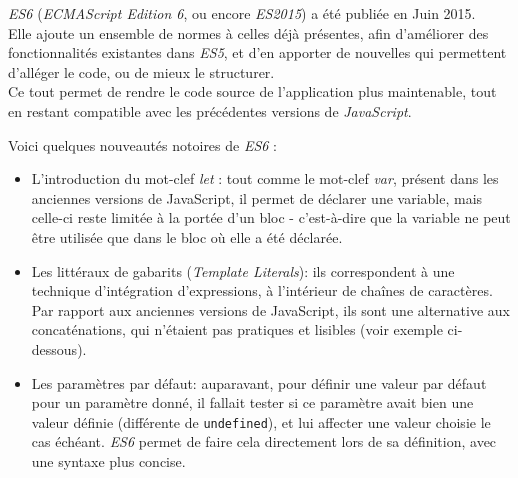 \documentclass[12pt,a4paper]{article}
\newenvironment{Shaded}{}{}
\newcommand{\KeywordTok}[1]{\textcolor[rgb]{0.00,0.44,0.13}{\textbf{{#1}}}}
\newcommand{\SpecialCharTok}[1]{\textcolor[rgb]{0.25,0.44,0.63}{{#1}}}
\newcommand{\StringTok}[1]{\textcolor[rgb]{0.25,0.44,0.63}{{#1}}}
\newcommand{\VerbatimStringTok}[1]{\textcolor[rgb]{0.25,0.44,0.63}{{#1}}}
\newcommand{\CommentTok}[1]{\textcolor[rgb]{0.38,0.63,0.69}{\textit{{#1}}}}
\newcommand{\OperatorTok}[1]{\textcolor[rgb]{0.40,0.40,0.40}{{#1}}}
\newcommand{\NormalTok}[1]{{#1}}
\begin{document}
  \bigskip

  \emph{ES6} (\emph{ECMAScript Edition 6}, ou encore \emph{ES2015}) a été
  publiée en Juin 2015.\\
  Elle ajoute un ensemble de normes à celles déjà présentes, afin
  d'améliorer des fonctionnalités existantes dans \emph{ES5}, et d'en
  apporter de nouvelles qui permettent d'alléger le code, ou de mieux le
  structurer.\\
  Ce tout permet de rendre le code source de l'application plus
  maintenable, tout en restant compatible avec les précédentes versions de
  \emph{JavaScript}.

  \bigskip

  Voici quelques nouveautés notoires de \emph{ES6} :

  \begin{itemize}
  \item
    L'introduction du mot-clef \emph{let} : tout comme le mot-clef
    \emph{var}, présent dans les anciennes versions de JavaScript, il
    permet de déclarer une variable, mais celle-ci reste limitée à la
    portée d'un bloc - c'est-à-dire que la variable ne peut être utilisée
    que dans le bloc où elle a été déclarée.
  \item
    Les littéraux de gabarits (\emph{Template Literals}): ils
    correspondent à une technique d'intégration d'expressions, à
    l'intérieur de chaînes de caractères. Par rapport aux anciennes
    versions de JavaScript, ils sont une alternative aux concaténations,
    qui n'étaient pas pratiques et lisibles (voir exemple ci-dessous).

  \begin{Shaded}
  \end{Shaded}
  \item
    Les paramètres par défaut: auparavant, pour définir une valeur par
    défaut pour un paramètre donné, il fallait tester si ce paramètre
    avait bien une valeur définie (différente de \texttt{undefined}), et
    lui affecter une valeur choisie le cas échéant. \emph{ES6} permet de
    faire cela directement lors de sa définition, avec une syntaxe plus
    concise.


\end{itemize}
\end{document}

